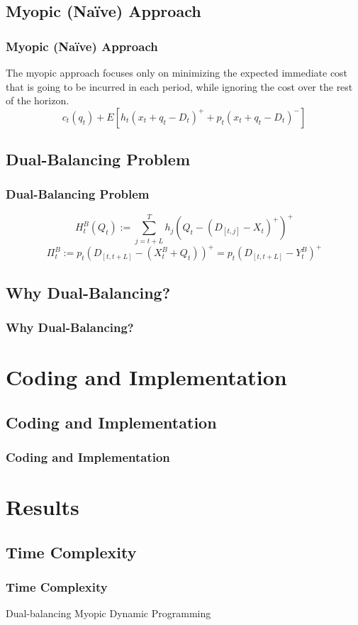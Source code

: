 \documentclass{beamer}
\begin{document}
    \subsection{Myopic (Na{\"i}ve) Approach}
    \begin{frame}
    \frametitle{Myopic (Na{\"i}ve) Approach}
      The myopic approach focuses only on minimizing the expected immediate cost that is going to be incurred in each period, while ignoring the cost over the rest of the horizon.
      \[c_{t}\left(q_{t}\right)+E\left[h_{t}\left(x_{t}+q_{t}-D_{t}\right)^{+}+p_{t}\left(x_{t}+q_{t}-D_{t}\right)^{-}\right]\]
    \end{frame}

    \subsection{Dual-Balancing Problem}
    \begin{frame}
    \frametitle{Dual-Balancing Problem}
      \[H_t^B(Q_t):=\sum\limits_{j=t+L}^T h_j(Q_t-(D_{[t,j]}-X_t)^+)^+\]
      \[\Pi_t^B:=p_t(D_{[t,t+L]}-(X_t^B+Q_t))^+=p_t(D_{[t,t+L]}-Y_t^B)^+\]
    \end{frame}

    \subsection{Why Dual-Balancing?}
    \begin{frame}
    \frametitle{Why Dual-Balancing?}

    \end{frame}
  \section{Coding and Implementation}
    \subsection{Coding and Implementation}
    \begin{frame}
    \frametitle{Coding and Implementation}

    \end{frame}
  \section{Results}
    \subsection{Time Complexity}
    \begin{frame}
    \frametitle{Time Complexity}
    Dual-balancing
    Myopic
    Dynamic Programming
    \end{frame}
\end{document}
